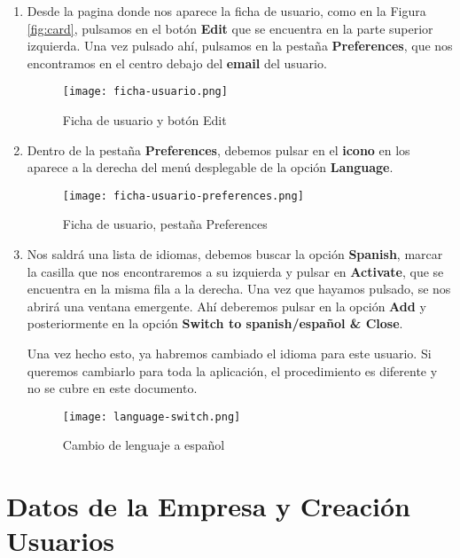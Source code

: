 \begin{enumerate}
    \item Desde la pagina donde nos aparece la ficha de usuario, como en la Figura \ref{fig:card}, pulsamos en el botón \textbf{Edit} que se encuentra en la parte superior izquierda. Una vez pulsado ahí, pulsamos en la pestaña \textbf{Preferences}, que nos encontramos en el centro debajo del \textbf{email} del usuario.

    \vspace{10ex}

   \begin{figure}[ht]
       \centering
       \texttt{[image: ficha-usuario.png]}
       \caption{Ficha de usuario y botón Edit}
   \end{figure}

   \item Dentro de la pestaña \textbf{Preferences}, debemos pulsar en el \textbf{icono} en los aparece a la derecha del menú desplegable de la opción \textbf{Language}.

   \begin{figure}[ht]
       \centering
       \texttt{[image: ficha-usuario-preferences.png]}
       \caption{Ficha de usuario, pestaña Preferences}
   \end{figure}

   \item Nos saldrá una lista de idiomas, debemos buscar la opción \textbf{Spanish}, marcar la casilla que nos encontraremos a su izquierda y pulsar en \textbf{Activate}, que se encuentra en la misma fila a la derecha. Una vez que hayamos pulsado, se nos abrirá una ventana emergente. Ahí deberemos pulsar en la opción \textbf{Add} y posteriormente en la opción \textbf{Switch to spanish/español \& Close}.

   Una vez hecho esto, ya habremos cambiado el idioma para este usuario. Si queremos cambiarlo para toda la aplicación, el procedimiento es diferente y no se cubre en este documento.

    \vspace{15ex}
   \begin{figure}[ht]
       \centering
       \texttt{[image: language-switch.png]}
       \caption{Cambio de lenguaje a español}
       \label{fig:lang}
   \end{figure}
\end{enumerate}

\section{Datos de la Empresa y Creación Usuarios}

